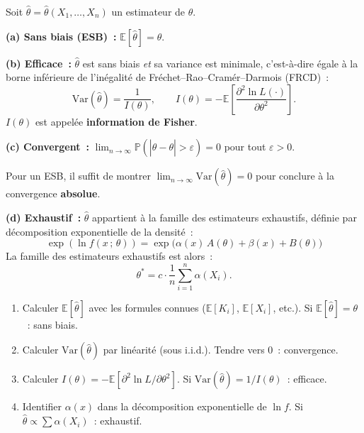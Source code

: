 \documentclass[11pt,a4paper]{article}
\newcommand{\E}{\mathbb{E}}
\newcommand{\Var}{\mathrm{Var}}
\newcommand{\Prob}{\mathbb{P}}
\renewcommand{\P}{\Prob}
\begin{document}
\begin{defbox}
Soit $\hat\theta = \hat\theta(X_1,\ldots,X_n)$ un estimateur de $\theta$.

\medskip
\textbf{(a) Sans biais (ESB)~:} $\E[\hat\theta] = \theta$.

\medskip
\textbf{(b) Efficace~:} $\hat\theta$ est sans biais \textit{et} sa variance est minimale, c'est-\`a-dire \'egale \`a la borne inf\'erieure de l'in\'egalit\'e de Fr\'echet--Rao--Cram\'er--Darmois (FRCD)~:
$$\Var(\hat\theta) = \frac{1}{I(\theta)}, \qquad
  I(\theta) = -\E\!\left[\frac{\partial^2\ln L(\cdot)}{\partial\theta^2}\right].$$
$I(\theta)$ est appel\'ee \textbf{information de Fisher}.

\medskip
\textbf{(c) Convergent~:} $\displaystyle\lim_{n\to\infty}\P(|\hat\theta-\theta|>\varepsilon) = 0$ pour tout $\varepsilon>0$.

Pour un ESB, il suffit de montrer $\displaystyle\lim_{n\to\infty}\Var(\hat\theta) = 0$ pour conclure \`a la convergence \textbf{absolue}.

\medskip
\textbf{(d) Exhaustif~:} $\hat\theta$ appartient \`a la famille des estimateurs exhaustifs, d\'efinie par d\'ecomposition exponentielle de la densit\'e~:
$$\exp(\ln f(x\,;\,\theta)) = \exp\!\bigl(\alpha(x)\,A(\theta)+\beta(x)+B(\theta)\bigr)$$
La famille des estimateurs exhaustifs est alors~:
$$\theta^* = c\cdot\frac{1}{n}\sum_{i=1}^n \alpha(X_i).$$
\end{defbox}

\begin{methbox}
\begin{enumerate}
  \item Calculer $\E[\hat\theta]$ avec les formules connues ($\E[K_i]$, $\E[X_i]$, etc.). Si $\E[\hat\theta]=\theta$~: sans biais.
  \item Calculer $\Var(\hat\theta)$ par lin\'earit\'e (sous i.i.d.). Tendre vers 0~: convergence.
  \item Calculer $I(\theta) = -\E[\partial^2\ln L/\partial\theta^2]$. Si $\Var(\hat\theta)=1/I(\theta)$~: efficace.
  \item Identifier $\alpha(x)$ dans la d\'ecomposition exponentielle de $\ln f$. Si $\hat\theta \propto \sum\alpha(X_i)$~: exhaustif.
\end{enumerate}
\end{methbox}
\end{document}
